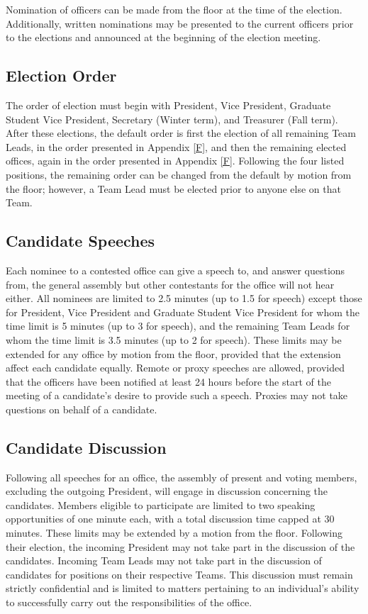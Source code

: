 Nomination of officers can be made from the floor at the
time of the election. Additionally, written nominations may be presented to the current
officers prior to the elections and announced at the beginning of the election meeting.


\subsection{Election Order} \label{II.5}

The order of election must begin with President, Vice
President, Graduate Student Vice President, Secretary (Winter term), and Treasurer (Fall
term). After these elections, the default order is first the election of all remaining Team
Leads, in the order presented in Appendix \ref{F}, and then the remaining elected offices, again
in the order presented in Appendix \ref{F}. Following the four listed positions, the remaining
order can be changed from the default by motion from the floor; however, a Team Lead
must be elected prior to anyone else on that Team.


\subsection{Candidate Speeches} \label{II.6}

Each nominee to a contested office can give a
speech to, and answer questions from, the general assembly but other contestants for the
office will not hear either. All nominees are limited to 2.5 minutes (up to 1.5 for speech)
except those for President, Vice President and Graduate Student Vice President for whom
the time limit is 5 minutes (up to 3 for speech), and the remaining Team Leads for whom
the time limit is 3.5 minutes (up to 2 for speech). These limits may be extended for any
office by motion from the floor, provided that the extension affect each candidate equally.
Remote or proxy speeches are allowed, provided that the officers have been notified at least
24 hours before the start of the meeting of a candidate’s desire to provide such a speech.
Proxies may not take questions on behalf of a candidate.


\subsection{Candidate Discussion} \label{II.7}

Following all speeches for an office, the assembly
of present and voting members, excluding the outgoing President, will engage in discussion
concerning the candidates. Members eligible to participate are limited to two speaking opportunities of one minute each, with a total discussion time capped at 30 minutes. 
These limits may be extended by a motion from the floor. Following their election, the incoming President may
not take part in the discussion of the candidates. Incoming Team Leads may not take part
in the discussion of candidates for positions on their respective Teams. This discussion
must remain strictly confidential and is limited to matters pertaining to an individual’s
ability to successfully carry out the responsibilities of the office.


